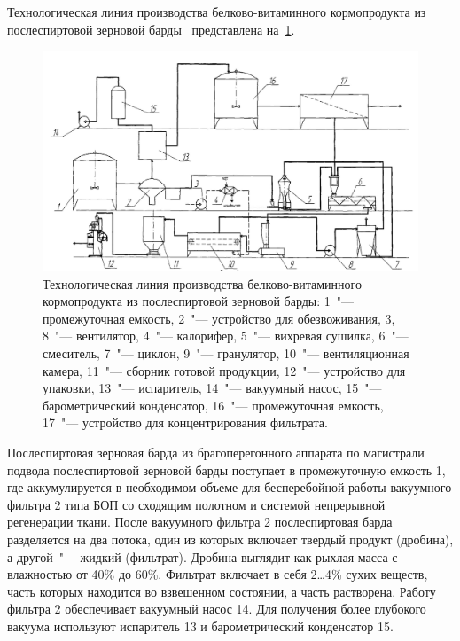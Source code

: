 Технологическая линия производства белково-витаминного кормопродукта из послеспиртовой зерновой барды~\cite{Antipov.Technologycal.2005} представлена на~\cref{fig:stillage_antipov}.
\begin{figure}[htb]
\centering
\includegraphics[width=\textwidth]{figures/temp/antipov.jpg}
\caption[Технологическая линия производства белково-витаминного кормопродукта из послеспиртовой зерновой барды]{Технологическая линия производства белково-витаминного кормопродукта из послеспиртовой зерновой барды: 1~"--- промежуточная емкость, 2~"--- устройство для обезвоживания, 3, 8~"--- вентилятор, 4~"--- калорифер, 5~"--- вихревая сушилка, 6~"--- смеситель, 7~"--- циклон, 9~"--- гранулятор, 10~"--- вентиляционная камера, 11~"--- сборник готовой продукции, 12~"--- устройство для упаковки, 13~"--- испаритель, 14~"--- вакуумный насос, 15~"--- барометрический конденсатор, 16~"--- промежуточная емкость, 17~"--- устройство для концентрирования фильтрата.}\label{fig:stillage_antipov}
\end{figure}
Послеспирт\-овая зерновая барда из брагоперегонного аппарата по магистрали подвода послеспиртовой зерновой барды поступает в промежуточную емкость 1, где аккумулируется в необходимом объеме для бесперебойной работы вакуумного фильтра 2 типа БОП со сходящим полотном и системой непрерывной регенерации ткани.
После вакуумного фильтра 2 послеспиртовая барда разделяется на два потока, один из которых включает твердый продукт (дробина), а другой~"--- жидкий (фильтрат).
Дробина выглядит как рыхлая масса с влажностью от 40\% до 60\%. Фильтрат включает в себя 2\dots4\% сухих веществ, часть которых находится во взвешенном состоянии, а часть растворена.
Работу фильтра 2 обеспечивает вакуумный насос 14.
Для получения более глубокого вакуума используют испаритель 13 и барометрический конденсатор 15.
